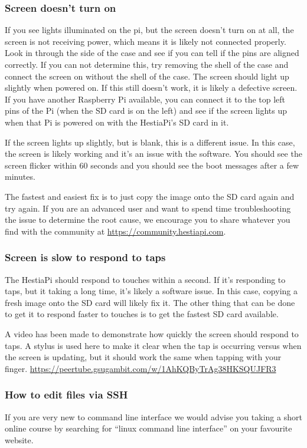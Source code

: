 \subsubsection{Screen doesn't turn on}
If you see lights illuminated on the pi, but the screen doesn't turn on at all,
the screen is not receiving power, which means it is likely not connected
properly. Look in through the side of the case and see if you can tell if the
pins are aligned correctly. If you can not determine this, try removing the
shell of the case and connect the screen on without the shell of the case. The
screen should light up slightly when powered on. If this still doesn't work, it
is likely a defective screen. If you have another Raspberry Pi available, you
can connect it to the top left pins of the Pi (when the SD card is on the left)
and see if the screen lights up when that Pi is powered on with the HestiaPi's
SD card in it.

If the screen lights up slightly, but is blank, this is a different issue. In
this case, the screen is likely working and it's an issue with the software.
You should see the screen flicker within 60 seconds and you should see the
boot messages after a few minutes.

The fastest and easiest fix is to just copy the image onto the SD card again
and try again. If you are an advanced user and want to spend time
troubleshooting the issue to determine the root cause, we encourage you to
share whatever you find with the community at
\url{https://community.hestiapi.com}.

\subsubsection{Screen is slow to respond to taps}
The HestiaPi should respond to touches within a second. If it's responding
to taps, but it taking a long time, it's likely a software issue. In this
case, copying a fresh image onto the SD card will likely fix it. The other
thing that can be done to get it to respond faster to touches is to get the
fastest SD card available.

A video has been made to demonstrate how quickly the screen should respond to
taps. A stylus is used here to make it clear when the tap is occurring versus
when the screen is updating, but it should work the same when tapping with your
finger. \url{https://peertube.gsugambit.com/w/1AhKQByTrAg38HKSQUJFR3}

\subsubsection{How to edit files via SSH}
If you are very new to command line interface we would advise you taking a
short online course by searching for ``linux command line interface'' on your
favourite website.

